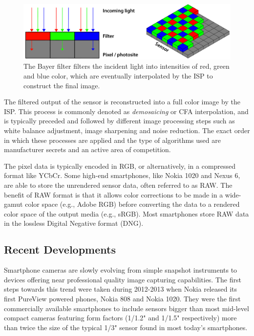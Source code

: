 \documentclass[thesis.tex]{subfiles}
\begin{document}
\begin{figure}[h]
\centering \includegraphics[width=\textwidth]{images/bayer}
\caption{The Bayer filter filters the incident light into intensities of red, green and blue color, which are eventually interpolated by the ISP to construct the final image. \label{figure:bayer}}
\end{figure}

The filtered output of the sensor is reconstructed into a full color image by the ISP. This process is commonly denoted as \textit{demosaicing} or CFA interpolation, and is typically preceded and followed by different image processing steps such as white balance adjustment, image sharpening and noise reduction. The exact order in which these processes are applied and the type of algorithms used are manufacturer secrets and an active area of competition.

The pixel data is typically encoded in RGB, or alternatively, in a compressed format like YCbCr. Some high-end smartphones, like Nokia 1020 and Nexus 6, are able to store the unrendered sensor data, often referred to as RAW. The benefit of RAW format is that it allows color corrections to be made in a wide-gamut color space (e.g., Adobe RGB) before converting the data to a rendered color space of the output media (e.g., sRGB). Most smartphones store RAW data in the lossless Digital Negative format (DNG).

\subsection{Recent Developments}\label{chapter:solutions}

Smartphone cameras are slowly evolving from simple snapshot instruments to devices offering near professional quality image capturing capabilities. The first steps towards this trend were taken during 2012-2013 when Nokia released its first PureView powered phones, Nokia 808 and Nokia 1020. They were the first commercially available smartphones to include sensors bigger than most mid-level compact cameras featuring form factors (1/1.2" and 1/1.5" respectively) more than twice the size of the typical 1/3" sensor found in most today's smartphones.
\end{document}
